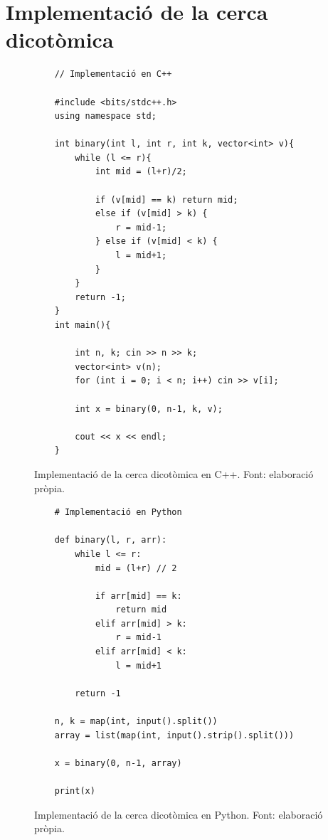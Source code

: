 \section{Implementació de la cerca dicotòmica}
\begin{figure}[H]
    \begin{verbatim}
    // Implementació en C++
    
    #include <bits/stdc++.h>
    using namespace std;
    
    int binary(int l, int r, int k, vector<int> v){
        while (l <= r){
            int mid = (l+r)/2;
    
            if (v[mid] == k) return mid;
            else if (v[mid] > k) {
                r = mid-1;
            } else if (v[mid] < k) {
                l = mid+1;
            }
        }
        return -1;
    }
    int main(){
    
        int n, k; cin >> n >> k;
        vector<int> v(n);
        for (int i = 0; i < n; i++) cin >> v[i];
    
        int x = binary(0, n-1, k, v);
    
        cout << x << endl;
    }
    \end{verbatim}
    \caption[Implementació de la cerca dicotòmica en C++.]{Implementació de la cerca dicotòmica en C++. Font: elaboració pròpia.}
    \label{Figura}
\end{figure}
\begin{figure}[H]
    \begin{verbatim}
    # Implementació en Python
    
    def binary(l, r, arr):
        while l <= r:
            mid = (l+r) // 2
    
            if arr[mid] == k:
                return mid
            elif arr[mid] > k:
                r = mid-1
            elif arr[mid] < k:
                l = mid+1
    
        return -1
        
    n, k = map(int, input().split())
    array = list(map(int, input().strip().split()))
    
    x = binary(0, n-1, array)
    
    print(x)
    \end{verbatim}
    \caption[Implementació de la cerca dicotòmica en Python.]{Implementació de la cerca dicotòmica en Python. Font: elaboració pròpia.}
    \label{Figura}
\end{figure}

